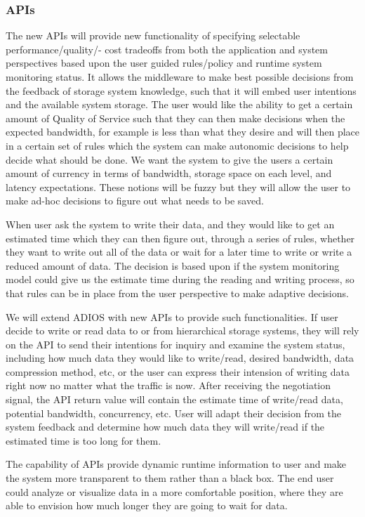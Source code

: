 \subsubsection{APIs}

The new APIs will provide new functionality of specifying selectable performance/quality/- cost tradeoffs from both the application and system perspectives based upon the user guided rules/policy and runtime system monitoring status. It allows the middleware to make best possible decisions from the feedback of storage system knowledge, such that it will embed user intentions and the available system storage. The user would like the ability to get a certain amount of Quality of Service such that they can then make decisions when the expected bandwidth, for example is less than what they desire and will then place in a certain set of rules which the system can make autonomic decisions to help decide what should be done. We want the system to give the users a certain amount of currency in terms of bandwidth, storage space on each level, and latency expectations. These notions will be fuzzy but they will allow the user to make ad-hoc decisions to figure out what needs to be saved.

When user ask the system to write their data, and they would like to get an estimated time which they can then figure out, through a series of rules, whether they want to write out all of the data or wait for a later time to write or write a reduced amount of data. The decision is based upon if the system monitoring model could give us the estimate time during the reading and writing process, so that rules can be in place from the user perspective to make adaptive decisions. 

We will extend ADIOS with new APIs to provide such functionalities. If user decide to write or read data to or from hierarchical storage systems, they will rely on the API to send their intentions for inquiry and examine the system status, including how much data they would like to write/read, desired bandwidth, data compression method, etc, or the user can express their intension of writing data right now no matter what the traffic is now. After receiving the negotiation signal, the API return value will contain the estimate time of write/read data, potential bandwidth, concurrency, etc. User will adapt their decision from the system feedback and determine how much data they will write/read if the estimated time is too long for them. 

The capability of APIs provide dynamic runtime information to user and make the system more transparent to them rather than a black box. The end user could analyze or visualize data in a more comfortable position, where they are able to envision how much longer they are going to wait for data. 
